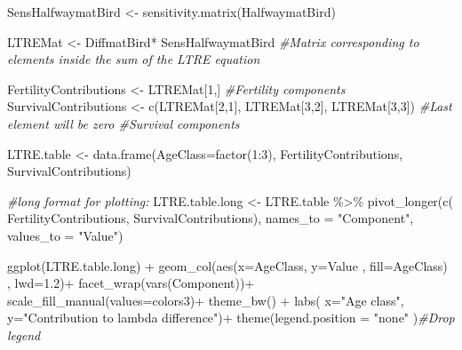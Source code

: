 \documentclass[
]{book}
\newenvironment{Shaded}{\begin{snugshade}}{\end{snugshade}}
\newcommand{\AttributeTok}[1]{\textcolor[rgb]{0.77,0.63,0.00}{#1}}
\newcommand{\CommentTok}[1]{\textcolor[rgb]{0.56,0.35,0.01}{\textit{#1}}}
\newcommand{\DecValTok}[1]{\textcolor[rgb]{0.00,0.00,0.81}{#1}}
\newcommand{\FloatTok}[1]{\textcolor[rgb]{0.00,0.00,0.81}{#1}}
\newcommand{\FunctionTok}[1]{\textcolor[rgb]{0.00,0.00,0.00}{#1}}
\newcommand{\NormalTok}[1]{#1}
\newcommand{\OtherTok}[1]{\textcolor[rgb]{0.56,0.35,0.01}{#1}}
\newcommand{\SpecialCharTok}[1]{\textcolor[rgb]{0.00,0.00,0.00}{#1}}
\newcommand{\StringTok}[1]{\textcolor[rgb]{0.31,0.60,0.02}{#1}}
\begin{document}
\begin{Shaded}
\begin{Highlighting}[]
\NormalTok{SensHalfwaymatBird }\OtherTok{\textless{}{-}} \FunctionTok{sensitivity.matrix}\NormalTok{(HalfwaymatBird)}
 
\NormalTok{LTREMat }\OtherTok{\textless{}{-}}\NormalTok{ DiffmatBird}\SpecialCharTok{*}\NormalTok{ SensHalfwaymatBird }\CommentTok{\#Matrix corresponding to elements inside the sum of the LTRE equation}

\NormalTok{FertilityContributions }\OtherTok{\textless{}{-}}\NormalTok{ LTREMat[}\DecValTok{1}\NormalTok{,] }\CommentTok{\#Fertility components}
\NormalTok{SurvivalContributions }\OtherTok{\textless{}{-}} \FunctionTok{c}\NormalTok{(LTREMat[}\DecValTok{2}\NormalTok{,}\DecValTok{1}\NormalTok{], LTREMat[}\DecValTok{3}\NormalTok{,}\DecValTok{2}\NormalTok{], LTREMat[}\DecValTok{3}\NormalTok{,}\DecValTok{3}\NormalTok{]) }\CommentTok{\#Last element will be zero \#Survival components}

\NormalTok{LTRE.table }\OtherTok{\textless{}{-}} \FunctionTok{data.frame}\NormalTok{(}\AttributeTok{AgeClass=}\FunctionTok{factor}\NormalTok{(}\DecValTok{1}\SpecialCharTok{:}\DecValTok{3}\NormalTok{), FertilityContributions, SurvivalContributions)}

\CommentTok{\#long format for plotting:}
\NormalTok{LTRE.table.long }\OtherTok{\textless{}{-}}\NormalTok{ LTRE.table }\SpecialCharTok{\%\textgreater{}\%} \FunctionTok{pivot\_longer}\NormalTok{(}\FunctionTok{c}\NormalTok{( FertilityContributions, SurvivalContributions),}
               \AttributeTok{names\_to =} \StringTok{"Component"}\NormalTok{, }\AttributeTok{values\_to =} \StringTok{"Value"}\NormalTok{)}
 
\FunctionTok{ggplot}\NormalTok{(LTRE.table.long) }\SpecialCharTok{+} 
  \FunctionTok{geom\_col}\NormalTok{(}\FunctionTok{aes}\NormalTok{(}\AttributeTok{x=}\NormalTok{AgeClass, }\AttributeTok{y=}\NormalTok{Value , }\AttributeTok{fill=}\NormalTok{AgeClass) , }\AttributeTok{lwd=}\FloatTok{1.2}\NormalTok{)}\SpecialCharTok{+}
  \FunctionTok{facet\_wrap}\NormalTok{(}\FunctionTok{vars}\NormalTok{(Component))}\SpecialCharTok{+}
  \FunctionTok{scale\_fill\_manual}\NormalTok{(}\AttributeTok{values=}\NormalTok{colors3)}\SpecialCharTok{+}
  \FunctionTok{theme\_bw}\NormalTok{() }\SpecialCharTok{+}
  \FunctionTok{labs}\NormalTok{( }\AttributeTok{x=}\StringTok{"Age class"}\NormalTok{, }\AttributeTok{y=}\StringTok{"Contribution to lambda difference"}\NormalTok{)}\SpecialCharTok{+}
    \FunctionTok{theme}\NormalTok{(}\AttributeTok{legend.position =} \StringTok{"none"}\NormalTok{ )}\CommentTok{\#Drop legend}
\end{Highlighting}
\end{Shaded}
\end{document}

